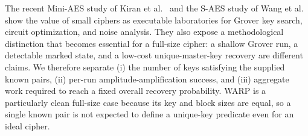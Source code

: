 \documentclass[pdflatex,sn-nature]{sn-jnl}
\theoremstyle{thmstyleone}
\theoremstyle{thmstyletwo}
\begin{document}
The recent Mini-AES study of Kiran et al.~\cite{Kiran2026} and the S-AES study of Wang et al.~\cite{Wang2025} show the value of small ciphers as executable laboratories for Grover key search, circuit optimization, and noise analysis.  They also expose a methodological distinction that becomes essential for a full-size cipher: a shallow Grover run, a detectable marked state, and a low-cost unique-master-key recovery are different claims.  We therefore separate (i) the number of keys satisfying the supplied known pairs, (ii) per-run amplitude-amplification success, and (iii) aggregate work required to reach a fixed overall recovery probability.  WARP is a particularly clean full-size case because its key and block sizes are equal, so a single known pair is not expected to define a unique-key predicate even for an ideal cipher.
\end{document}
